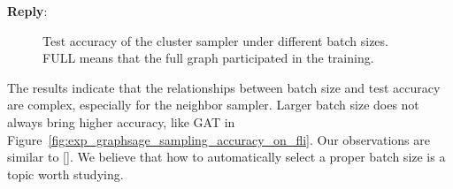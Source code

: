 \documentclass[12pt]{article}
\newenvironment{reply}
   {\medskip \noindent \textbf{Reply}:\  }
   {\medskip}
\begin{document}
\begin{reply}
        \begin{figure}[h]
            \centering
            \caption{Test accuracy of the cluster sampler under different batch sizes. FULL means that the full graph participated in the training.}
            \label{fig:exp_sampling_relative_batch_size_accuracy_cluster}
        \end{figure}
    
    The results indicate that the relationships between batch size and test accuracy are complex, especially for the neighbor sampler.
    Larger batch size does not always bring higher accuracy, like GAT in Figure~\ref{fig:exp_graphsage_sampling_accuracy_on_fli}. 
    Our observations are similar to [\cite{zeng2020_graphsaint}].
    We believe that how to automatically select a proper batch size is a topic worth studying.
\end{reply}
\end{document}
